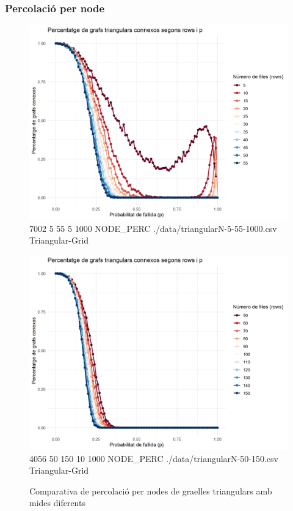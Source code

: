 \documentclass[a4paper]{article}
\begin{document}
	
	\subsubsection{Percolació per node}
	
	\begin{figure}[H]
		\centering
		\begin{minipage}{0.45\textwidth}
			\centering
			\includegraphics[width=\textwidth]{images/triangularN-5-55-1000}
			\footnotesize{7002 5 55 5 1000 NODE\_PERC ./data/triangularN-5-55-1000.csv Triangular-Grid}
		\end{minipage}
		\hfill
		\begin{minipage}{0.45\textwidth}
			\centering
			\includegraphics[width=\textwidth]{images/triangularE-50-150}
			\footnotesize{4056 50 150 10 1000 NODE\_PERC ./data/triangularN-50-150.csv Triangular-Grid}
		\end{minipage}
		\caption{Comparativa de percolació per nodes de graelles triangulars amb mides diferents}
		\label{fig:percolation_nodes_triangular}
	\end{figure}
	
\end{document}
